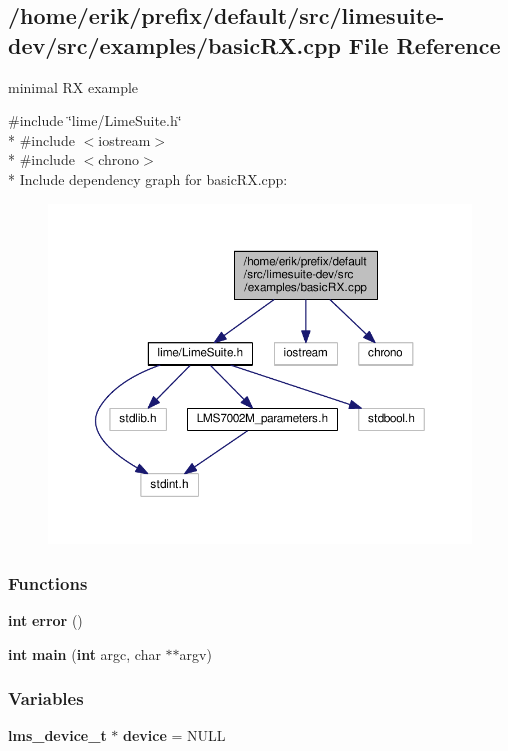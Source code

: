 \subsection{/home/erik/prefix/default/src/limesuite-\/dev/src/examples/basic\+RX.cpp File Reference}
\label{basicRX_8cpp}


minimal RX example  


{\ttfamily \#include \char`\"{}lime/\+Lime\+Suite.\+h\char`\"{}}\\*
{\ttfamily \#include $<$iostream$>$}\\*
{\ttfamily \#include $<$chrono$>$}\\*
Include dependency graph for basic\+R\+X.\+cpp\+:
\nopagebreak
\begin{figure}[H]
\begin{center}
\leavevmode
\includegraphics[width=350pt]{d7/d19/basicRX_8cpp__incl}
\end{center}
\end{figure}
\subsubsection*{Functions}
\begin{DoxyCompactItemize}
\item 
{\bf int} {\bf error} ()
\item 
{\bf int} {\bf main} ({\bf int} argc, char $\ast$$\ast$argv)
\end{DoxyCompactItemize}
\subsubsection*{Variables}
\begin{DoxyCompactItemize}
\item 
{\bf lms\+\_\+device\+\_\+t} $\ast$ {\bf device} = N\+U\+LL
\end{DoxyCompactItemize}


